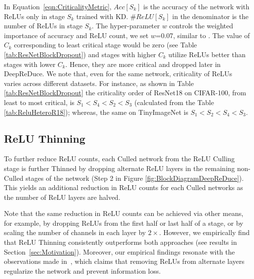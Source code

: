 In Equation~\ref{eqn:CriticalityMetric}, $Acc [S_k]$ is the accuracy of the network with ReLUs only in stage $S_k$ trained with KD. 
$\#ReLU [S_k]$ in the denominator is the number of ReLUs in stage $S_k$. 
The hyper-parameter $w$ controls the weighted importance of accuracy and ReLU count, 
we set $w$=0.07, similar to \cite{tan2019efficientnet}.
The value of $C_k$ corresponding to least critical stage would be zero (see Table \ref{tab:ResNetBlockDropout}) and stages with higher $C_k$ utilize ReLUs better than stages with lower $C_k$. Hence, they are more critical and dropped later in DeepReDuce. We note that, even for the same network, criticality of ReLUs varies across different datasets. For instance, as shown in Table \ref{tab:ResNetBlockDropout} the criticality order of ResNet18 on CIFAR-100, from least to most critical, is $S_1 < S_4 < S_2 < S_3$ (calculated from the Table \ref{tab:ReluHeteroR18}); whereas, the same on TinyImageNet is $S_1 < S_2 < S_4 < S_3$. 


\subsection{ReLU Thinning}
\label{sec:Thinning}
To further reduce ReLU counts, each Culled network from the ReLU Culling stage is further Thinned 
by dropping alternate ReLU layers in the remaining non-Culled stages of the network 
(Step 2 in Figure \ref{fig:BlockDiagramDeepReDuce}). This yields an additional reduction in ReLU counts for each Culled networks as the number of ReLU layers are halved.


  
Note that the same reduction in ReLU counts can be achieved via other means, for example, 
by dropping ReLUs from the first half or last half of a stage, or  
by scaling the number of channels in each 
layer by $2\times$. 
However, we empirically find that ReLU Thinning consistently outperforms both 
approaches (see results in Section~\ref{sec:Motivation}). 
Moreover, our empirical findings resonate with the observations made in~\cite{zhao2018reThinking}, which claims that removing ReLUs from alternate layers regularize the network and prevent information loss.

